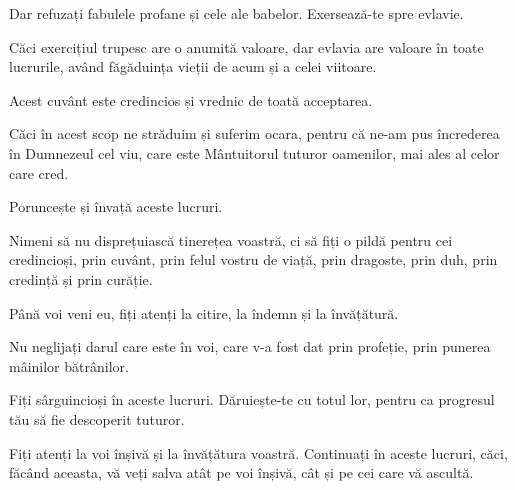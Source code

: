 {Dar refuzați fabulele profane și cele ale babelor. Exersează-te spre evlavie.

Căci exercițiul trupesc are o anumită valoare, dar evlavia are valoare în toate lucrurile, având făgăduința vieții de acum și a celei viitoare.

Acest cuvânt este credincios și vrednic de toată acceptarea.

Căci în acest scop ne străduim și suferim ocara, pentru că ne-am pus încrederea în Dumnezeul cel viu, care este Mântuitorul tuturor oamenilor, mai ales al celor care cred.

Poruncește și învață aceste lucruri.


\par }{\PP {}Nimeni să nu disprețuiască tinerețea voastră, ci să fiți o pildă pentru cei credincioși, prin cuvânt, prin felul vostru de viață, prin dragoste, prin duh, prin credință și prin curăție.

Până voi veni eu, fiți atenți la citire, la îndemn și la învățătură.

Nu neglijați darul care este în voi, care v-a fost dat prin profeție, prin punerea mâinilor bătrânilor.

Fiți sârguincioși în aceste lucruri. Dăruiește-te cu totul lor, pentru ca progresul tău să fie descoperit tuturor.

Fiți atenți la voi înșivă și la învățătura voastră. Continuați în aceste lucruri, căci, făcând aceasta, vă veți salva atât pe voi înșivă, cât și pe cei care vă ascultă.



\par }
